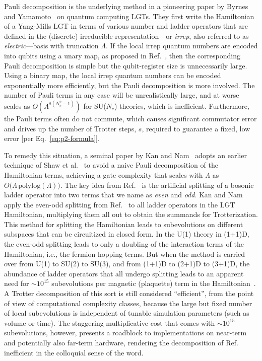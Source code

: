 \documentclass[aps,prd,twocolumn,showpacs,groupedaddress,superscriptaddress,nofootinbib,floatfix,preprintnumbers,longbibliography]{revtex4-1}
\begin{document}
Pauli decomposition is the underlying method in a pioneering paper by Byrnes and Yamamoto~\cite{Byrnes:2005qx} on quantum computing LGTs. They first write the Hamiltonian of a Yang-Mills LGT in terms of various number and ladder operators that are defined in the (discrete) irreducible-representation---or \emph{irrep}, also referred to as \emph{electric}---basis with truncation $\Lambda$. If the local irrep quantum numbers are encoded into qubits using a unary map, as proposed in Ref.~\cite{Byrnes:2005qx}, then the corresponding Pauli decomposition is simple but the qubit-register size is unnecessarily large. Using a binary map, the local irrep quantum numbers can be encoded exponentially more efficiently, but the Pauli decomposition is more involved. The number of Pauli terms in any case will be unrealistically large, and at worse scales as $O(\Lambda^{8(N_c^2-1)})$ for SU($N_c$) theories, which is inefficient. Furthermore, the Pauli terms often do not commute, which causes significant commutator error and drives up the number of Trotter steps, $s$, required to guarantee a fixed, low error [per Eq.~\eqref{eq:p2-formula}].

To remedy this situation, a seminal paper by Kan and Nam~\cite{Kan:2021xfc} adopts an earlier technique of Shaw et al.~\cite{Shaw:2020udc} to avoid a naive Pauli decomposition of the Hamiltonian terms, achieving a gate complexity that scales with $\Lambda$ as $O\big(\Lambda \, \text{polylog}(\Lambda)\big)$. 
The key idea from Ref.~\cite{Shaw:2020udc} is the artificial splitting of a bosonic ladder operator into two terms that we name as \emph{even} and \emph{odd}.
Kan and Nam apply the even-odd splitting from Ref.~\cite{Shaw:2020udc} to all ladder operators in the LGT Hamiltonian, multiplying them all out to obtain the summands for Trotterization.
This method for splitting the Hamiltonian leads to subevolutions on different subspaces that can be circuitized in closed form. In the U(1) theory in (1+1)D, the even-odd splitting leads to only a doubling of the interaction terms of the Hamiltonian, i.e., the fermion hopping terms. But when the method is carried over from U(1) to SU(2) to SU(3), and from (1+1)D to (2+1)D to (3+1)D, the abundance of ladder operators that all undergo splitting leads to an apparent need for $\sim 10^{15}$ subevolutions per magnetic (plaquette) term in the Hamiltonian~\cite{Kan:2021xfc}. A Trotter decomposition of this sort is still considered ``efficient'', from the point of view of computational complexity classes, because the large but fixed number of local subevolutions is independent of tunable simulation parameters (such as volume or time).
The staggering multiplicative cost that comes with $\sim 10^{15}$ subevolutions, however, presents a roadblock to implementations on near-term and potentially also far-term hardware, rendering the decomposition of Ref.~\cite{Kan:2021xfc} inefficient in the colloquial sense of the word.
\end{document}
